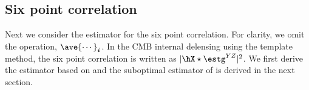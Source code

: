 \documentclass[aps,prd,twocolumn,superscriptaddress,groupedaddress,nofootinbib]{revtex4}
\def\o{\star}
\begin{document}
\subsection{Six point correlation} \label{app:6pt-opt}

Next we consider the estimator for the six point correlation. For clarity, we omit the operation, $\ave{\cdots}_{\bm i}$. 
In the CMB internal delensing using the template method, the six point correlation is written as $|\hX\o\estg^{YZ}|^2$.
We first derive the estimator based on  and the suboptimal estimator of  is 
derived in the next section. 
\end{document}
